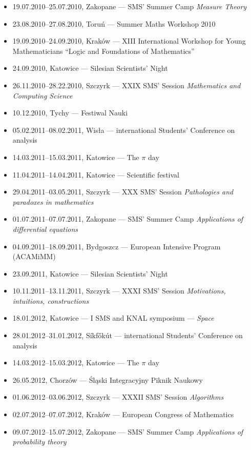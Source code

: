 \begin{itemize}
  \item 19.07.2010--25.07.2010, Zakopane ---  SMS' Summer Camp \textsl{Measure Theory}
  \item 23.08.2010--27.08.2010, Toruń --- Summer Maths Workshop 2010
  \item 19.09.2010--24.09.2010, Kraków --- XIII International Workshop for Young Mathematicians ``Logic and Foundations of Mathematics''
  \item 24.09.2010, Katowice --- Silesian Scientists' Night
  \item 26.11.2010--28.22.2010, Szczyrk --- XXIX SMS' Session \textsl{Mathematics and Computing Science}
  \item 10.12.2010, Tychy --- Festiwal Nauki
  \item 05.02.2011--08.02.2011, Wisła ---  international Students' Conference on analysis
  \item 14.03.2011--15.03.2011, Katowice --- The $\pi$ day
  \item 11.04.2011--14.04.2011, Katowice --- Scientific festival
  \item 29.04.2011--03.05.2011, Szczyrk --- XXX SMS' Session \textsl{Pathologies and paradoxes in mathematics}
  \item 01.07.2011--07.07.2011, Zakopane ---  SMS' Summer Camp \textsl{Applications of differential equations}
  \item 04.09.2011--18.09.2011, Bydgoszcz --- European Intensive Program (ACAMiMM)
  \item 23.09.2011, Katowice --- Silesian Scientists' Night
  \item 10.11.2011--13.11.2011, Szczyrk --- XXXI SMS' Session \textsl{Motivations, intuitions, constructions}
  \item 18.01.2012, Katowice --- I SMS and KNAL symposium --- \textsl{Space}
  \item 28.01.2012--31.01.2012, Síkfőkút ---  international Students' Conference on analysis
  \item 14.03.2012--15.03.2012, Katowice --- The $\pi$ day
  \item 26.05.2012, Chorzów --- Śląski Integracyjny Piknik Naukowy
  \item 01.06.2012--03.06.2012, Szczyrk --- XXXII SMS' Session \textsl{Algorithms}
  \item 02.07.2012--07.07.2012, Kraków ---  European Congress of Mathematics
  \item 09.07.2012--15.07.2012, Zakopane ---  SMS' Summer Camp \textsl{Applications of probability theory}

\end{itemize}
